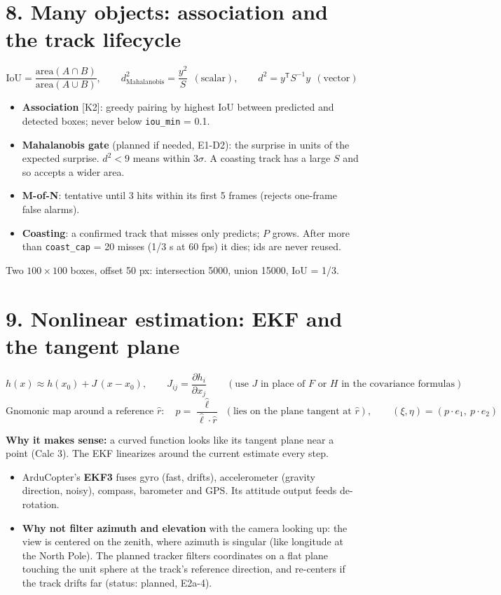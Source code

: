 \documentclass[10pt]{article}
\newcommand{\code}[1]{\textcolor{code}{\texttt{#1}}}
\newcommand{\why}[1]{\par\textbf{\textcolor{idea}{Why it makes sense:}} #1}
\begin{document}
\section*{8. Many objects: association and the track lifecycle}
\begin{eqbox}
\[
\text{IoU} = \frac{\text{area}(A\cap B)}{\text{area}(A\cup B)},\qquad
d^2_\text{Mahalanobis} = \frac{y^2}{S}\ \ (\text{scalar}),\qquad d^2 = y^{\mathsf T}S^{-1}y\ \ (\text{vector})
\]
\end{eqbox}
\begin{itemize}
\item \textbf{Association} [K2]: greedy pairing by highest IoU between predicted and
detected boxes; never below \code{iou\_min} = 0.1.
\item \textbf{Mahalanobis gate} (planned if needed, E1-D2): the surprise in units of
the expected surprise. $d^2 < 9$ means within $3\sigma$. A coasting track has a large
$S$ and so accepts a wider area.
\item \textbf{M-of-N}: tentative until 3 hits within its first 5 frames (rejects
one-frame false alarms).
\item \textbf{Coasting}: a confirmed track that misses only predicts; $P$ grows. After
more than \code{coast\_cap} = 20 misses (1/3 s at 60 fps) it dies; ids are never reused.
\end{itemize}
\begin{exbox}
Two $100\times100$ boxes, offset 50 px: intersection 5000, union 15000, IoU = 1/3.
\end{exbox}

\section*{9. Nonlinear estimation: EKF and the tangent plane}
\begin{eqbox}
\[
h(x) \approx h(x_0) + J\,(x - x_0),\qquad J_{ij} = \frac{\partial h_i}{\partial x_j}
\qquad(\text{use } J \text{ in place of } F \text{ or } H \text{ in the covariance formulas})
\]
\[
\text{Gnomonic map around a reference } \hat r:\quad
p = \frac{\hat\ell}{\hat\ell\cdot\hat r}\ \ (\text{lies on the plane tangent at } \hat r),\qquad
(\xi, \eta) = (p\cdot e_1,\ p\cdot e_2)
\]
\end{eqbox}
\why{a curved function looks like its tangent plane near a point (Calc 3). The EKF
linearizes around the current estimate every step.}
\begin{itemize}
\item ArduCopter's \textbf{EKF3} fuses gyro (fast, drifts), accelerometer (gravity
direction, noisy), compass, barometer and GPS. Its attitude output feeds de-rotation.
\item \textbf{Why not filter azimuth and elevation} with the camera looking up: the view
is centered on the zenith, where azimuth is singular (like longitude at the North Pole).
The planned tracker filters coordinates on a flat plane touching the unit sphere at the
track's reference direction, and re-centers if the track drifts far (status: planned,
E2a-4).
\end{itemize}
\end{document}
